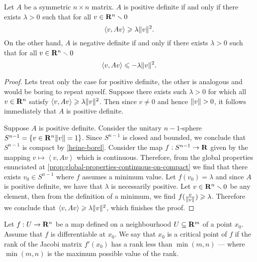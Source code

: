 \begin{lemma}
    \label{lem:pos-neg-definite-lambda}
    Let \(A\) be a symmetric \(n \times n\) matrix. \(A\) is positive definite if and
    only if there exists \(\lambda > 0\) such that for all \(v \in \mathbf{R}^n \smallsetminus 0\)
    \[
        \left\langle v, A v \right\rangle \geqslant \lambda \lVert v\rVert^2.
    \]
    On the other hand, \(A\) is negative definite if and only if there exists \(\lambda
    > 0\) such that for all \(v \in \mathbf{R}^n \smallsetminus 0\)
    \[
        \left\langle v, A v \right\rangle \leqslant - \lambda \lVert v\rVert^2.
    \]
\end{lemma}

\begin{proof}
    Lets treat only the case for positive definite, the other is analogous and
    would be boring to repeat myself. Suppose there exists such \(\lambda > 0\) for
    which all \(v \in \mathbf{R}^n\) satisfy \(\left\langle v, Av \right\rangle \geqslant \lambda \lVert v\rVert^2\). Then
    since \(v \neq 0\) and hence \(\lVert v\rVert > 0\), it follows immediately that \(A\)
    is positive definite.

    Suppose \(A\) is positive definite. Consider the unitary \(n-1\)-sphere
    \(S^{n-1} = \{v \in \mathbf{R}^{n} \relax \lVert v\rVert = 1\}\). Since \(S^{n-1}\) is closed and
    bounded, we conclude that \(S^{n-1}\) is compact by
    \cref{heine-borel}. Consider the map \(f: S^{n-1} \to \mathbf{R}\) given by the mapping
    \(v \mapsto \left\langle v, Av \right\rangle\) which is continuous. Therefore, from the global
    properties enunciated at \cref{prop:global-properties-continuous-on-compact}
    we find that there exists \(v_0 \in S^{n-1}\) where \(f\) assumes a minimum
    value. Let \(f(v_0) = \lambda\) and since \(A\) is positive definite, we have that
    \(\lambda\) is necessarily positive. Let \(v \in \mathbf{R}^n \smallsetminus 0\) be any element, then from
    the definition of a minimum, we find \(f(\frac{v}{\lVert v\rVert}) \geqslant \lambda\). Therefore
    we conclude that \(\left\langle v, Av \right\rangle \geqslant \lambda \lVert v\rVert^2\), which finishes the
    proof.
\end{proof}

\begin{definition}
    \label{def:critical-point}
    Let \(f: U \to \mathbf{R}^n\) be a map defined on a neighbourhood \(U \subseteq \mathbf{R}^m\) of a
    point \(x_0\). Assume that \(f\) is differentiable at \(x_0\). We say that
    \(x_0\) is a critical point of \(f\) if the rank of the Jacobi matrix
    \(f'(x_0)\) has a rank less than \(\min(m, n)\) --- where \(\min(m, n)\) is the
    maximum possible value of the rank.
\end{definition}

